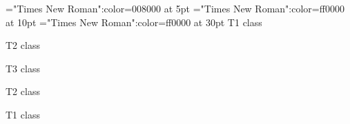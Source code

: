 \font\tctbta="Times New Roman":color=008000 at 5pt
\font\tbta="Times New Roman":color=ff0000 at 10pt
\font\ta="Times New Roman":color=ff0000 at 30pt
\ta T1 class 

\tbta T2 class 

\tctbta T3 class 

\tbta T2 class 

\ta T1 class 


\bye
